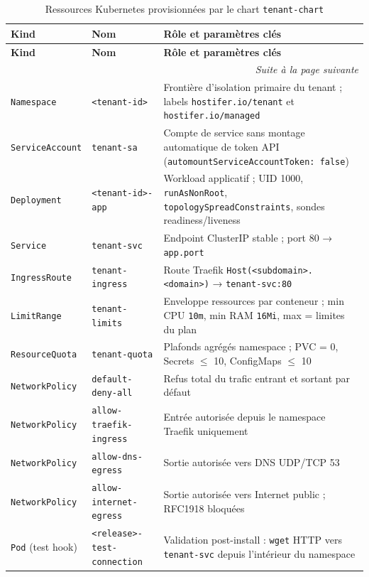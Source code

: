 \begin{longtable}{|p{3cm}|p{3cm}|p{7cm}|}
\caption{Ressources Kubernetes provisionnées par le chart \texttt{tenant-chart}}
\label{tab:helm-resources} \\

\hline
\textbf{Kind} & \textbf{Nom} & \textbf{Rôle et paramètres clés} \\
\hline
\endfirsthead

\hline
\textbf{Kind} & \textbf{Nom} & \textbf{Rôle et paramètres clés} \\
\hline
\endhead

\hline
\multicolumn{3}{r|}{\small\textit{Suite à la page suivante}} \\
\endfoot

\hline
\endlastfoot

\texttt{Namespace}
  & \texttt{<tenant-id>}
  & Frontière d'isolation primaire du tenant ; labels \texttt{hostifer.io/tenant} et \texttt{hostifer.io/managed} \\
\hline
\texttt{ServiceAccount}
  & \texttt{tenant-sa}
  & Compte de service sans montage automatique de token API (\texttt{automountServiceAccountToken: false}) \\
\hline
\texttt{Deployment}
  & \texttt{<tenant-id>-app}
  & Workload applicatif ; UID 1000, \texttt{runAsNonRoot}, \texttt{topologySpreadConstraints}, sondes readiness/liveness \\
\hline
\texttt{Service}
  & \texttt{tenant-svc}
  & Endpoint ClusterIP stable ; port 80 → \texttt{app.port} \\
\hline
\texttt{IngressRoute}
  & \texttt{tenant-ingress}
  & Route Traefik \texttt{Host(<subdomain>.<domain>)} → \texttt{tenant-svc:80} \\
\hline
\texttt{LimitRange}
  & \texttt{tenant-limits}
  & Enveloppe ressources par conteneur ; min CPU \texttt{10m}, min RAM \texttt{16Mi}, max = limites du plan \\
\hline
\texttt{ResourceQuota}
  & \texttt{tenant-quota}
  & Plafonds agrégés namespace ; PVC = 0, Secrets $\leq$ 10, ConfigMaps $\leq$ 10 \\
\hline
\texttt{NetworkPolicy}
  & \texttt{default-deny-all}
  & Refus total du trafic entrant et sortant par défaut \\
\hline
\texttt{NetworkPolicy}
  & \texttt{allow-traefik-ingress}
  & Entrée autorisée depuis le namespace Traefik uniquement \\
\hline
\texttt{NetworkPolicy}
  & \texttt{allow-dns-egress}
  & Sortie autorisée vers DNS UDP/TCP 53 \\
\hline
\texttt{NetworkPolicy}
  & \texttt{allow-internet-egress}
  & Sortie autorisée vers Internet public ; RFC1918 bloquées \\
\hline
\texttt{Pod} (test hook)
  & \texttt{<release>-test-connection}
  & Validation post-install : \texttt{wget} HTTP vers \texttt{tenant-svc} depuis l'intérieur du namespace \\
\hline

\end{longtable}

